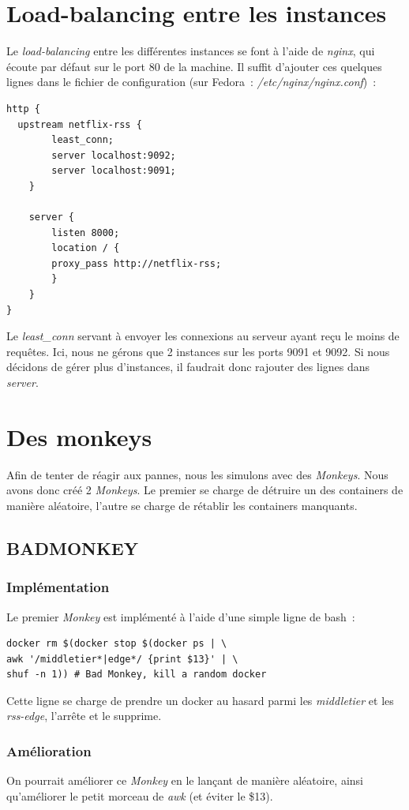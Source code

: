 \documentclass{article}
\begin{document}
	\section{Load-balancing entre les instances}
	Le \emph{load-balancing} entre les différentes instances se font à l'aide de \emph{nginx}, qui écoute par défaut sur le port 80 de la machine. Il suffit d'ajouter ces quelques lignes dans le fichier de configuration (sur Fedora~: \emph{/etc/nginx/nginx.conf})~:
	\begin{verbatim}
http {
  upstream netflix-rss {
		least_conn;
		server localhost:9092;
		server localhost:9091;
	}

	server {
		listen 8000;
		location / {
	  	proxy_pass http://netflix-rss;
		}
	}
}
	\end{verbatim}
	Le \emph{least\_conn} servant à envoyer les connexions au serveur ayant reçu le moins de requêtes. Ici, nous ne gérons que 2 instances sur les ports 9091 et 9092. Si nous décidons de gérer plus d'instances, il faudrait donc rajouter des lignes dans \emph{server}.


	\section{Des monkeys}
	Afin de tenter de réagir aux pannes, nous les simulons avec des \emph{Monkeys}. Nous avons donc créé 2 \emph{Monkeys}. Le premier se charge de détruire un des containers de manière aléatoire, l'autre se charge de rétablir les containers manquants.
	\subsection{BADMONKEY}
	\subsubsection{Implémentation}
	Le premier \emph{Monkey} est implémenté à l'aide d'une simple ligne de bash~:
	\begin{verbatim}
docker rm $(docker stop $(docker ps | \
awk '/middletier*|edge*/ {print $13}' | \
shuf -n 1)) # Bad Monkey, kill a random docker
	\end{verbatim}
	Cette ligne se charge de prendre un docker au hasard parmi les \emph{middletier} et les \emph{rss-edge}, l'arrête et le supprime.
	\subsubsection{Amélioration}
	On pourrait améliorer ce \emph{Monkey} en le lançant de manière aléatoire, ainsi qu'améliorer le petit morceau de \emph{awk} (et éviter le \$13).
\end{document}
